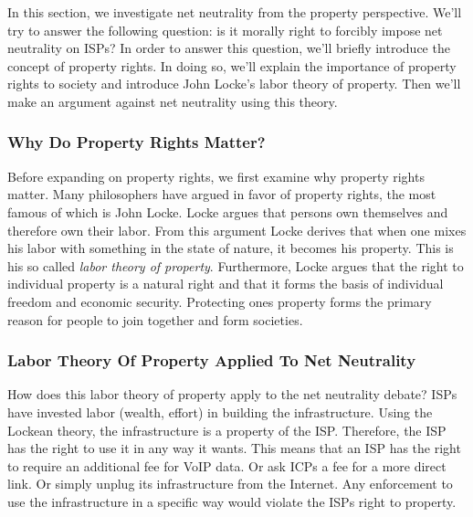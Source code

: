 
In this section, we investigate net neutrality from the property perspective. We'll try to answer the following question: is it morally right to forcibly impose net neutrality on \acp{ISP}? In order to answer this question, we'll briefly introduce the concept of property rights. In doing so, we'll explain the importance of property rights to society and introduce John Locke's labor theory of property. Then we'll make an argument against net neutrality using this theory.

\subsubsection{Why Do Property Rights Matter?}
Before expanding on property rights, we first examine why property rights matter. Many philosophers have argued in favor of property rights, the most famous of which is John Locke. Locke argues that persons own themselves and therefore own their labor. From this argument Locke derives that when one mixes his labor with something in the state of nature, it becomes his property. This is his so called \emph{labor theory of property}. Furthermore, Locke argues that the right to individual property is a natural right and that it forms the basis of individual freedom and economic security. Protecting ones property forms the primary reason for people to join together and form societies.

\subsubsection{Labor Theory Of Property Applied To Net Neutrality}
How does this labor theory of property apply to the net neutrality debate? \acp{ISP} have invested labor (wealth, effort) in building the infrastructure. Using the Lockean theory, the infrastructure is a property of the \ac{ISP}. Therefore, the \ac{ISP} has the right to use it in any way it wants. This means that an \ac{ISP} has the right to require an additional fee for \ac{VoIP} data. Or ask ICPs a fee for a more direct link. Or simply unplug its infrastructure from the Internet. Any enforcement to use the infrastructure in a specific way would violate the \acp{ISP} right to property.

